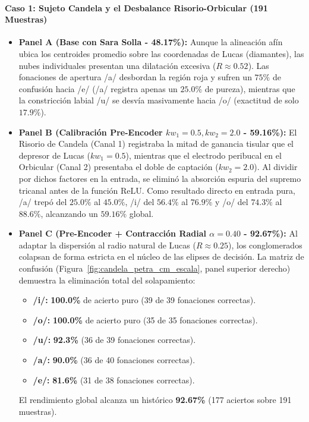 \documentclass[11pt,a4paper,openany]{book}
\theoremstyle{definition}
\begin{document}
\paragraph{Caso 1: Sujeto Candela y el Desbalance Risorio-Orbicular (191 Muestras)}
\begin{itemize}
    \item \textbf{Panel A (Base con Sara Solla - 48.17\%):} Aunque la alineación afín ubica los centroides promedio sobre las coordenadas de Lucas (diamantes), las nubes individuales presentan una dilatación excesiva ($R \approx 0.52$). Las fonaciones de apertura /a/ desbordan la región roja y sufren un $75\%$ de confusión hacia /e/ (/a/ registra apenas un $25.0\%$ de pureza), mientras que la constricción labial /u/ se desvía masivamente hacia /o/ (exactitud de solo $17.9\%$).
    \item \textbf{Panel B (Calibración Pre-Encoder $kw_1=0.5, kw_2=2.0$ - 59.16\%):} El Risorio de Candela (Canal 1) registraba la mitad de ganancia tisular que el depresor de Lucas ($kw_1 = 0.5$), mientras que el electrodo peribucal en el Orbicular (Canal 2) presentaba el doble de captación ($kw_2 = 2.0$). Al dividir por dichos factores en la entrada, se eliminó la absorción espuria del supremo tricanal antes de la función $\text{ReLU}$. Como resultado directo en entrada pura, /a/ trepó del $25.0\%$ al $45.0\%$, /i/ del $56.4\%$ al $76.9\%$ y /o/ del $74.3\%$ al $88.6\%$, alcanzando un $59.16\%$ global.
    \item \textbf{Panel C (Pre-Encoder + Contracción Radial $\alpha=0.40$ - 92.67\%):} Al adaptar la dispersión al radio natural de Lucas ($R \approx 0.25$), los conglomerados colapsan de forma estricta en el núcleo de las elipses de decisión. La matriz de confusión (Figura~\ref{fig:candela_petra_cm_escala}, panel superior derecho) demuestra la eliminación total del solapamiento:
    \begin{itemize}
        \item \textbf{/i/:} \textbf{100.0\%} de acierto puro (39 de 39 fonaciones correctas).
        \item \textbf{/o/:} \textbf{100.0\%} de acierto puro (35 de 35 fonaciones correctas).
        \item \textbf{/u/:} \textbf{92.3\%} (36 de 39 fonaciones correctas).
        \item \textbf{/a/:} \textbf{90.0\%} (36 de 40 fonaciones correctas).
        \item \textbf{/e/:} \textbf{81.6\%} (31 de 38 fonaciones correctas).
    \end{itemize}
    El rendimiento global alcanza un histórico \textbf{92.67\%} (177 aciertos sobre 191 muestras).
\end{itemize}
\end{document}
